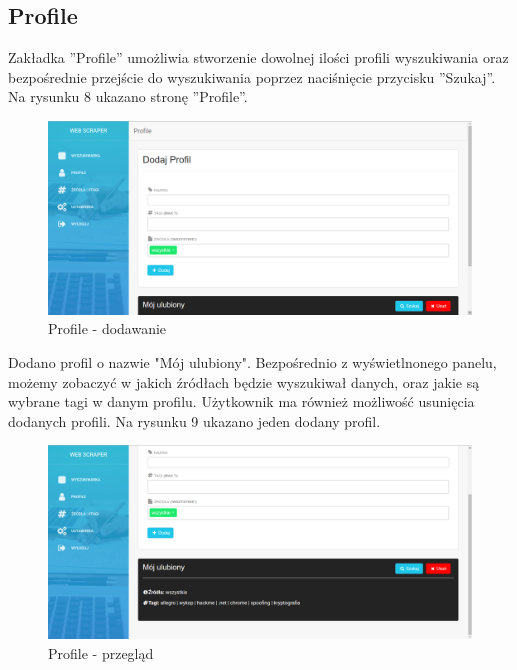 \documentclass[12pt, titlepage]{article}
\begin{document}
	\subsection{Profile}
	Zakładka ''Profile'' umożliwia stworzenie dowolnej ilości profili wyszukiwania oraz bezpośrednie przejście do wyszukiwania poprzez naciśnięcie przycisku ''Szukaj''. Na rysunku 8 ukazano stronę ''Profile''.
	\begin{figure}[H]
	\centering
	\includegraphics[scale=0.40]{obrazki/profile1.png}
	\caption{Profile - dodawanie}
	\label{fig:db_schema}
	\end{figure}
	\newpage
	Dodano profil o nazwie "Mój ulubiony". Bezpośrednio z wyświetlnonego panelu, możemy zobaczyć w jakich źródłach będzie wyszukiwał danych, oraz jakie są wybrane tagi w danym profilu. Użytkownik ma również możliwość usunięcia dodanych profili. Na rysunku 9 ukazano jeden dodany profil.
	\begin{figure}[H]
		\centering
		\includegraphics[scale=0.40]{obrazki/profile2.png}
		\caption{Profile - przegląd}
		\label{fig:db_schema}
	\end{figure}

	
	\newpage
\end{document}
